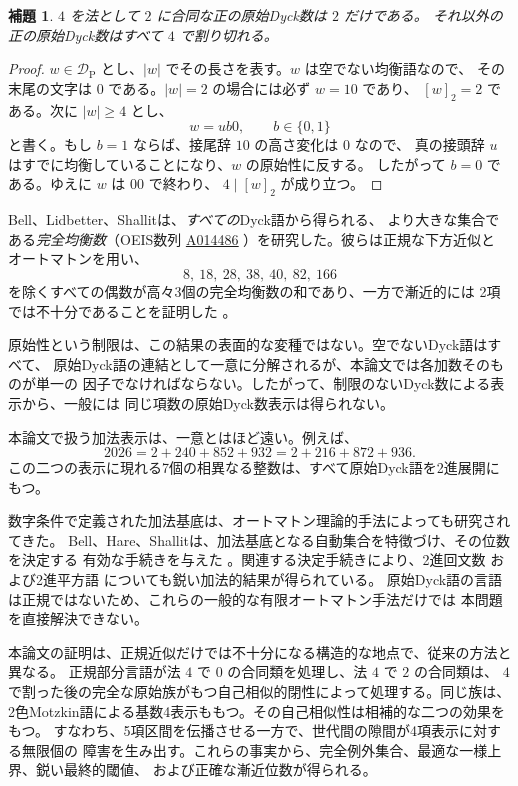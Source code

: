 \documentclass[12pt]{ltjsarticle}
\theoremstyle{plain}
\newtheorem{lemma}[theorem]{補題}
\theoremstyle{definition}
\theoremstyle{plain}
\newcommand{\DP}{\mathcal{D}_{\mathrm{P}}}
\newcommand{\seqnum}[1]{\href{https://oeis.org/#1}{\textrm{\underline{#1}}}}
\begin{document}
\begin{lemma}\label{lem:mod4}
$4$ を法として $2$ に合同な正の原始Dyck数は $2$ だけである。
それ以外の正の原始Dyck数はすべて $4$ で割り切れる。
\end{lemma}

\begin{proof}
$w\in\DP$ とし、$|w|$ でその長さを表す。$w$ は空でない均衡語なので、
その末尾の文字は $0$ である。$|w|=2$ の場合には必ず $w=10$ であり、
$[w]_2=2$ である。次に $|w|\geq4$ とし、
\[
 w=ub0,\qquad b\in\{0,1\}
\]
と書く。もし $b=1$ ならば、接尾辞 $10$ の高さ変化は $0$ なので、
真の接頭辞 $u$ はすでに均衡していることになり、$w$ の原始性に反する。
したがって $b=0$ である。ゆえに $w$ は $00$ で終わり、
$4\mid[w]_2$ が成り立つ。
\end{proof}

Bell、Lidbetter、Shallitは、\emph{すべての}Dyck語から得られる、
より大きな集合である\emph{完全均衡数}（OEIS数列
\seqnum{A014486} \cite{OEIS-A014486}）を研究した。彼らは正規な下方近似と
オートマトンを用い、
\[
        8,\ 18,\ 28,\ 38,\ 40,\ 82,\ 166
\]
を除くすべての偶数が高々3個の完全均衡数の和であり、一方で漸近的には
2項では不十分であることを証明した \cite[Thm.\ 14]{BLS}。

原始性という制限は、この結果の表面的な変種ではない。空でないDyck語はすべて、
原始Dyck語の連結として一意に分解されるが、本論文では各加数そのものが単一の
因子でなければならない。したがって、制限のないDyck数による表示から、一般には
同じ項数の原始Dyck数表示は得られない。

本論文で扱う加法表示は、一意とはほど遠い。例えば、
\[
 2026=2+240+852+932=2+216+872+936.
\]
この二つの表示に現れる7個の相異なる整数は、すべて原始Dyck語を2進展開にもつ。

数字条件で定義された加法基底は、オートマトン理論的手法によっても研究されてきた。
Bell、Hare、Shallitは、加法基底となる自動集合を特徴づけ、その位数を決定する
有効な手続きを与えた \cite{BHS}。関連する決定手続きにより、2進回文数
\cite{RSS} および2進平方語 \cite{MNRS} についても鋭い加法的結果が得られている。
原始Dyck語の言語は正規ではないため、これらの一般的な有限オートマトン手法だけでは
本問題を直接解決できない。

本論文の証明は、正規近似だけでは不十分になる構造的な地点で、従来の方法と異なる。
正規部分言語が法 $4$ で $0$ の合同類を処理し、法 $4$ で $2$ の合同類は、
$4$ で割った後の完全な原始族がもつ自己相似的閉性によって処理する。同じ族は、
2色Motzkin語による基数4表示ももつ。その自己相似性は相補的な二つの効果をもつ。
すなわち、5項区間を伝播させる一方で、世代間の隙間が4項表示に対する無限個の
障害を生み出す。これらの事実から、完全例外集合、最適な一様上界、鋭い最終的閾値、
および正確な漸近位数が得られる。
\end{document}
